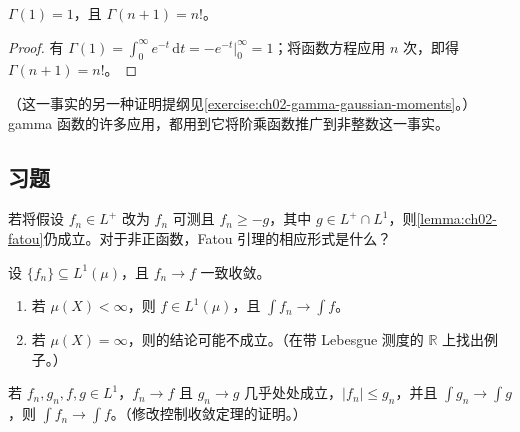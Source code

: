 \documentclass[../../main.tex]{subfiles}%
\begin{document}
\begin{proposition}\label{proposition:ch02-gamma-factorial}
$\Gamma(1)=1$，且 $\Gamma(n+1)=n!$。
\end{proposition}
\begin{proof}
有 $\Gamma(1)=\int_0^\infty e^{-t}\,\mathrm{d}t=-e^{-t}|_0^\infty=1$；将函数方程应用 $n$ 次，即得 $\Gamma(n+1)=n!$。
\end{proof}
（这一事实的另一种证明提纲见\cref{exercise:ch02-gamma-gaussian-moments}。）gamma 函数的许多应用，都用到它将阶乘函数推广到非整数这一事实。

\subsection*{习题}
\begin{exercise}\label{exercise:ch02-fatou-lower-bound}
若将假设 $f_n\in L^+$ 改为 $f_n$ 可测且 $f_n\ge-g$，其中 $g\in L^+\cap L^1$，则\cref{lemma:ch02-fatou}仍成立。对于非正函数，Fatou 引理的相应形式是什么？
\end{exercise}
\begin{exercise}\label{exercise:ch02-uniform-integral-limit}
设 $\{f_n\}\subseteq L^1(\mu)$，且 $f_n\to f$ 一致收敛。
\begin{enumerate}
\item\label{item:ch02-uniform-finite-measure} 若 $\mu(X)<\infty$，则 $f\in L^1(\mu)$，且 $\int f_n\to\int f$。
\item\label{item:ch02-uniform-infinite-measure} 若 $\mu(X)=\infty$，则的结论可能不成立。（在带 Lebesgue 测度的 $\mathbb{R}$ 上找出例子。）
\end{enumerate}
\end{exercise}
\begin{exercise}[广义控制收敛定理]\label{exercise:ch02-generalized-dominated}
若 $f_n,g_n,f,g\in L^1$，$f_n\to f$ 且 $g_n\to g$ 几乎处处成立，$|f_n|\le g_n$，并且 $\int g_n\to\int g$，则 $\int f_n\to\int f$。（修改控制收敛定理的证明。）
\end{exercise}
\end{document}
